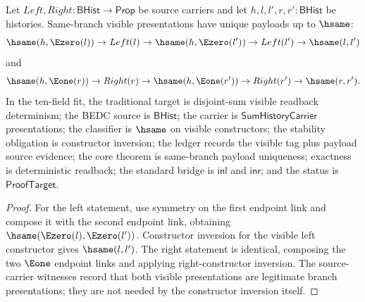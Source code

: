 \begin{theorem}
\label{thm:sum-visible-branch-payload-determinism}
Let $Left,Right:\mathsf{BHist}\to\mathsf{Prop}$ be source carriers and let
$h,l,l',r,r':\mathsf{BHist}$ be histories. Same-branch visible presentations
have unique payloads up to $\hsame$:
$$
\hsame(h,\Ezero(l))\to Left(l)\to
\hsame(h,\Ezero(l'))\to Left(l')\to \hsame(l,l')
$$
and
$$
\hsame(h,\Eone(r))\to Right(r)\to
\hsame(h,\Eone(r'))\to Right(r')\to \hsame(r,r').
$$
In the ten-field fit, the traditional target is disjoint-sum visible readback
determinism; the BEDC source is $\mathsf{BHist}$; the carrier is
$\mathsf{SumHistoryCarrier}$ presentations; the classifier is $\hsame$ on
visible constructors; the stability obligation is constructor inversion; the
ledger records the visible tag plus payload source evidence; the core theorem
is same-branch payload uniqueness; exactness is deterministic readback; the
standard bridge is $\mathsf{inl}$ and $\mathsf{inr}$; and the status is
$\mathsf{ProofTarget}$.
\end{theorem}
\begin{proof}
For the left statement, use symmetry on the first endpoint link and compose it
with the second endpoint link, obtaining
$\hsame(\Ezero(l),\Ezero(l'))$. Constructor inversion for the visible left
constructor gives $\hsame(l,l')$. The right statement is identical, composing
the two $\Eone$ endpoint links and applying right-constructor inversion. The
source-carrier witnesses record that both visible presentations are legitimate
branch presentations; they are not needed by the constructor inversion itself.
\end{proof}

